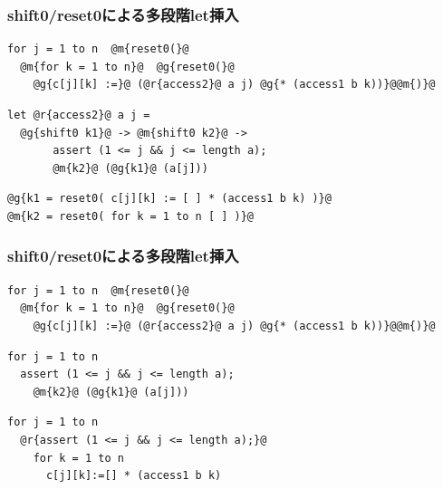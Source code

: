 \documentclass[dvipdfmx,cjk,xcolor=dvipsnames,envcountsect,notheorems,12pt,handout]{beamer} \usepackage{pgfpages} \pgfpagesuselayout{4 on 1}[a4paper,landscape,border shrink=5mm]
\theoremstyle{definition}
\begin{document}
\begin{frame}[fragile]
  \frametitle{shift0/reset0による多段階let挿入}

\begin{lstlisting}
for j = 1 to n  @m{reset0(}@
  @m{for k = 1 to n}@  @g{reset0(}@
    @g{c[j][k] :=}@ (@r{access2}@ a j) @g{* (access1 b k))}@@m{)}@
\end{lstlisting}

  \pause

\begin{lstlisting}
let @r{access2}@ a j =
  @g{shift0 k1}@ -> @m{shift0 k2}@ ->
       assert (1 <= j && j <= length a);
       @m{k2}@ (@g{k1}@ (a[j]))
\end{lstlisting}

  \pause

\begin{lstlisting}
@g{k1 = reset0( c[j][k] := [ ] * (access1 b k) )}@
@m{k2 = reset0( for k = 1 to n [ ] )}@
\end{lstlisting}
\end{frame}

\begin{frame}[fragile]
  \frametitle{shift0/reset0による多段階let挿入}

\begin{lstlisting}
for j = 1 to n  @m{reset0(}@
  @m{for k = 1 to n}@  @g{reset0(}@
    @g{c[j][k] :=}@ (@r{access2}@ a j) @g{* (access1 b k))}@@m{)}@
\end{lstlisting}

  \pause

\begin{lstlisting}
for j = 1 to n
  assert (1 <= j && j <= length a);
    @m{k2}@ (@g{k1}@ (a[j]))
\end{lstlisting}

  \pause

\begin{lstlisting}
for j = 1 to n
  @r{assert (1 <= j && j <= length a);}@
    for k = 1 to n
      c[j][k]:=[] * (access1 b k)
\end{lstlisting}

\end{frame}
\end{document}
